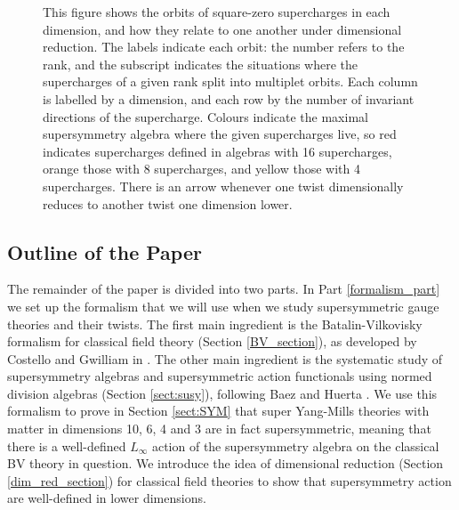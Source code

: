 \documentclass[10pt, oneside]{article}
\begin{document}
\begin{figure}[hbp]
\caption{This figure shows the orbits of square-zero supercharges in each dimension, and how they relate to one another under dimensional reduction.  The labels indicate each orbit: the number refers to the rank, and the subscript indicates the situations where the supercharges of a given rank split into multiplet orbits.  Each column is labelled by a dimension, and each row by the number of invariant directions of the supercharge.  Colours indicate the maximal supersymmetry algebra where the given supercharges live, so red indicates supercharges defined in algebras with 16 supercharges, orange those with 8 supercharges, and yellow those with 4 supercharges.  There is an arrow whenever one twist dimensionally reduces to another twist one dimension lower.}
\label{fig:superchargeorbits}
\end{figure}

\subsection*{Outline of the Paper}
The remainder of the paper is divided into two parts.  In Part \ref{formalism_part} we set up the formalism that we will use when we study supersymmetric gauge theories and their twists.  The first main ingredient is the Batalin-Vilkovisky formalism \cite{BatalinVilkovisky} for classical field theory (Section \ref{BV_section}), as developed by Costello and Gwilliam in \cite{CostelloBook, Book1, Book2}.  The other main ingredient is the systematic study of supersymmetry algebras and supersymmetric action functionals using normed division algebras (Section \ref{sect:susy}), following Baez and Huerta \cite{BaezHuerta}.  We use this formalism to prove in Section \ref{sect:SYM} that super Yang-Mills theories with matter in dimensions 10, 6, 4 and 3 are in fact supersymmetric, meaning that there is a well-defined $L_\infty$ action of the supersymmetry algebra on the classical BV theory in question.  We introduce the idea of dimensional reduction (Section \ref{dim_red_section}) for classical field theories to show that supersymmetry action are well-defined in lower dimensions.
\end{document}
